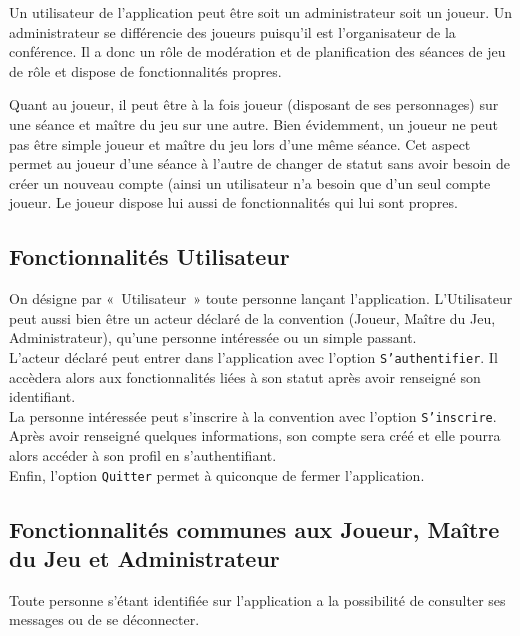 \documentclass[11pt]{article}
\begin{document}
Un utilisateur de l'application peut être soit un administrateur soit un joueur. Un administrateur se différencie des joueurs puisqu'il est l'organisateur de la conférence. Il a donc un rôle de modération et de planification des séances de jeu de rôle et dispose de fonctionnalités propres.

Quant au joueur, il peut être à la fois joueur (disposant de ses personnages) sur une séance et maître du jeu sur une autre. Bien évidemment, un joueur ne peut pas être simple joueur et maître du jeu lors d’une même séance. Cet aspect permet au joueur d’une séance à l’autre de changer de statut sans avoir besoin de créer un nouveau compte (ainsi un utilisateur n’a besoin que d’un seul compte joueur. Le joueur dispose lui aussi de fonctionnalités qui lui sont propres.



\subsection{Fonctionnalités Utilisateur}

On désigne par «~Utilisateur~» toute personne lançant l'application. L'Utilisateur peut aussi bien être un acteur déclaré de la convention (Joueur, Maître du Jeu, Administrateur), qu'une personne intéressée ou un simple passant.\\

L'acteur déclaré peut entrer dans l'application avec l'option \texttt{S'authentifier}. Il accèdera alors aux fonctionnalités liées à son statut après avoir renseigné son identifiant.\\

La personne intéressée peut s'inscrire à la convention avec l'option \texttt{S'inscrire}. Après avoir renseigné quelques informations, son compte sera créé et elle pourra alors accéder à son profil en s'authentifiant.\\

Enfin, l'option \texttt{Quitter} permet à quiconque de fermer l'application.\\



\subsection{Fonctionnalités communes aux Joueur, Maître du Jeu et Administrateur}

Toute personne s'étant identifiée sur l'application a la possibilité de consulter ses messages ou de se déconnecter.\\
\end{document}
